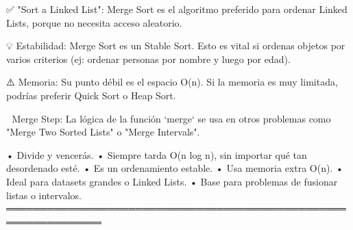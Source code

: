 \begin{dsaentrevistas}

✅ "Sort a Linked List": Merge Sort es el algoritmo preferido para 
   ordenar Linked Lists, porque no necesita acceso aleatorio.

💡 Estabilidad: Merge Sort es un Stable Sort. Esto es vital si 
   ordenas objetos por varios criterios (ej: ordenar personas por 
   nombre y luego por edad).

⚠️ Memoria: Su punto débil es el espacio O(n). Si la memoria es muy
   limitada, podrías preferir Quick Sort o Heap Sort.

🔑 Merge Step: La lógica de la función `merge` se usa en otros problemas
   como "Merge Two Sorted Lists" o "Merge Intervals".

\end{dsaentrevistas}

\begin{dsaresumen}

• Divide y vencerás.
• Siempre tarda O(n log n), sin importar qué tan desordenado esté.
• Es un ordenamiento estable.
• Usa memoria extra O(n).
• Ideal para datasets grandes o Linked Lists.
• Base para problemas de fusionar listas o intervalos.
════════════════════════════════════════════════════════════════

\end{dsaresumen}


